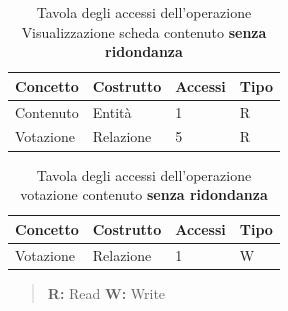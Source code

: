 \documentclass[a4paper]{article}
\begin{document}
\begin{table}[H]
\begin{tabular}{ | l | l | l | l | }
\hline
\textbf{Concetto} & \textbf{Costrutto} & \textbf{Accessi} & \textbf{Tipo} \\
\hline
\hline
Contenuto & Entità & 1 & R \\
\hline
Votazione & Relazione & 5 & R \\
\hline
\end{tabular}
  \caption{Tavola degli accessi dell'operazione Visualizzazione scheda contenuto \textbf{senza ridondanza}}
\end{table}

\begin{table}[H]
\begin{tabular}{ | l | l | l | l | }
\hline
\textbf{Concetto} & \textbf{Costrutto} & \textbf{Accessi} & \textbf{Tipo} \\
\hline
\hline
Votazione & Relazione & 1 & W \\
\hline
\end{tabular}
  \caption{Tavola degli accessi dell'operazione votazione contenuto \textbf{senza ridondanza}}
\end{table}

\begin{quotation}\footnotesize
\textbf{R:} Read \quad \textbf{W:} Write 
\end{quotation}
\end{document}
